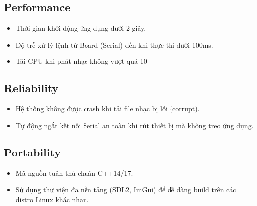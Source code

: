 \documentclass{article}
\begin{document}
\subsection{Performance}
\begin{itemize}
    \item Thời gian khởi động ứng dụng dưới 2 giây.
    \item Độ trễ xử lý lệnh từ Board (Serial) đến khi thực thi dưới 100ms.
    \item Tải CPU khi phát nhạc không vượt quá 10%
\end{itemize}

\subsection{Reliability}
\begin{itemize}
    \item Hệ thống không được crash khi tải file nhạc bị lỗi (corrupt).
    \item Tự động ngắt kết nối Serial an toàn khi rút thiết bị mà không treo ứng dụng.
\end{itemize}

\subsection{Portability}
\begin{itemize}
    \item Mã nguồn tuân thủ chuân C++14/17.
    \item Sử dụng thư viện đa nền tảng (SDL2, ImGui) để dễ dàng build trên các distro Linux khác nhau.
\end{itemize}
\end{document}
